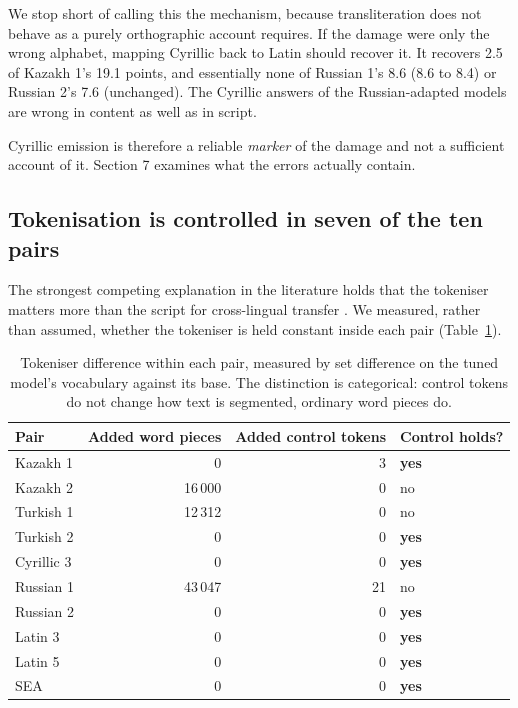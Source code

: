 \documentclass[final]{clv2025}
\begin{document}
We stop short of calling this the mechanism, because transliteration does not
behave as a purely orthographic account requires. If the damage were only the
wrong alphabet, mapping Cyrillic back to Latin should recover it. It recovers
2.5 of Kazakh 1's 19.1 points, and essentially none of Russian 1's 8.6 (8.6 to
8.4) or Russian 2's 7.6 (unchanged). The Cyrillic answers of the
Russian-adapted models are wrong in content as well as in script.

Cyrillic emission is therefore a reliable \emph{marker} of the damage and not a
sufficient account of it. Section 7 examines what the errors actually contain.

\subsection{Tokenisation is controlled in seven of the ten pairs}

The strongest competing explanation in the literature holds that the tokeniser
matters more than the script for cross-lingual transfer
\cite{tufa2024unknown}. We measured, rather than assumed, whether the tokeniser
is held constant inside each pair (Table~\ref{tab:tokenizer}).

\begin{table}[h!]
\caption{Tokeniser difference within each pair, measured by set difference on
the tuned model's vocabulary against its base. The distinction is categorical:
control tokens do not change how text is segmented, ordinary word pieces do.}
\label{tab:tokenizer}
\centering
\begin{tabular}{lrrl}
\toprule
Pair & Added word pieces & Added control tokens & Control holds? \\
\midrule
Kazakh 1 & 0 & 3 & \textbf{yes} \\
Kazakh 2 & 16\,000 & 0 & no \\
Turkish 1 & 12\,312 & 0 & no \\
Turkish 2 & 0 & 0 & \textbf{yes} \\
Cyrillic 3 & 0 & 0 & \textbf{yes} \\
Russian 1 & 43\,047 & 21 & no \\
Russian 2 & 0 & 0 & \textbf{yes} \\
Latin 3 & 0 & 0 & \textbf{yes} \\
Latin 5 & 0 & 0 & \textbf{yes} \\
SEA & 0 & 0 & \textbf{yes} \\
\bottomrule
\end{tabular}
\end{table}
\end{document}
